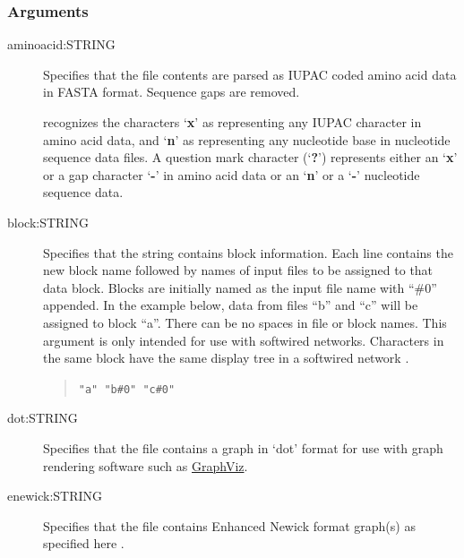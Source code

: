 	\subsubsection{Arguments}
	
	\begin{description}
	
		\item [aminoacid:STRING] Specifies that the file contents are parsed as IUPAC 
		coded amino acid data in FASTA \citep{PearsonandLipman1988} format. Sequence 
		gaps are removed.

		\begin{tcolorbox}[enhanced,fit to height=3cm,
  		colback=JungleGreen!40!black!2!white,colframe=JungleGreen!70!black,title=Note,
  		drop fuzzy shadow]
  		\phyg recognizes the characters `\textbf{x}' as representing any IUPAC character in 
		amino acid data, and `\textbf{n}' as representing any nucleotide base in nucleotide 
		sequence data files. A question mark character (`\textbf{?}') represents either an 
		`\textbf{x}' or a gap character `\textbf{-}' in amino acid data or an `\textbf{n}' or a 
		`\textbf{-}' nucleotide sequence data.
		\end{tcolorbox}

		\item [block:STRING] Specifies that the string contains block information. Each line 
		contains the new block name followed by names of input files to be assigned to that 
		data block. Blocks are initially named as the input file name with ``\#0'' appended. 
		In the example below, data from files ``b'' and ``c'' will be assigned to block ``a''. 
		There can be no spaces in file or block names. This argument is only intended for 
		use with softwired networks. Characters in the same block have the same display 
		tree in a softwired network \citep{WheelerandWashburn2023}.
			
			\begin{quote}
			\texttt{"a" "b\#0" "c\#0"}
			\end{quote}
	
		\item [dot:STRING] Specifies that the file contains a graph in `dot' format for use with 
		graph rendering software such as \href{https://en.wikipedia.org/wiki/Graphviz}{GraphViz}.
			
		\item [enewick:STRING] Specifies that the file contains Enhanced Newick format graph(s) 
		as specified here \citep{Cardonaetal2008}. 
			

\end{description}

